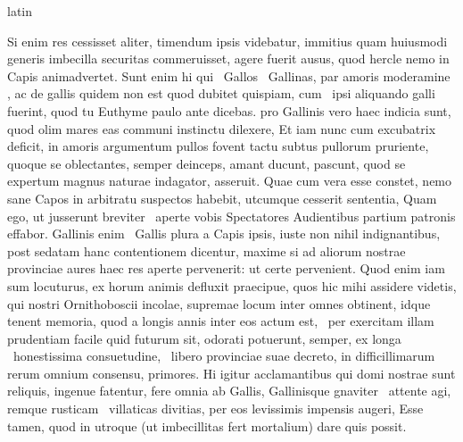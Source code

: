 \documentclass[12pt]{book}
\renewenvironment{latin}
    	{\begin{hyphenrules}{latin}}
    	{\end{hyphenrules}}
\begin{document}
\begin{pages}
\begin{latin}
\begin{Leftside}
                    Si enim res cessisset aliter, timendum ipsis videbatur, 
                     immitius quam huiusmodi generis imbecilla securitas commeruisset, agere fuerit ausus, quod hercle nemo in Capis animadvertet. 
                    Sunt enim hi qui ﻿\ampersand\ Gallos ﻿\ampersand\ Gallinas, par amoris moderamine , 
                    ac de gallis quidem non est quod dubitet quispiam, cum ﻿\ampersand\ ipsi aliquando galli fuerint, 
                    quod tu Euthyme paulo ante dicebas. 
                    pro Gallinis vero haec indicia sunt, quod olim mares eas communi instinctu dilexere, 
                    Et iam nunc cum excubatrix deficit, in amoris argumentum pullos fovent tactu subtus  pullorum pruriente, quoque se oblectantes, 
                    semper deinceps, amant ducunt, pascunt, 
                    quod se expertum magnus naturae indagator, asseruit. 
                    Quae cum vera esse constet, nemo sane Capos in arbitratu suspectos habebit, utcumque cesserit sententia, 
                    Quam ego, ut jusserunt breviter ﻿\ampersand\ aperte vobis Spectatores
                    Audientibus partium patronis effabor.  
                     Gallinis enim ﻿\ampersand\ Gallis plura a Capis ipsis, iuste non nihil indignantibus, 
                    post sedatam hanc contentionem dicentur, maxime si ad aliorum nostrae provinciae aures haec res aperte pervenerit: 
                    ut certe pervenient. 
                    Quod enim iam sum locuturus, ex horum animis defluxit praecipue, quos hic mihi assidere videtis, 
                    qui nostri Ornithoboscii incolae, supremae  locum inter omnes obtinent, 
                    idque tenent memoria, quod a longis annis inter eos actum est, ﻿\ampersand\ per exercitam illam prudentiam facile quid futurum sit, 
                    odorati potuerunt, semper, ex longa ﻿\ampersand\ honestissima consuetudine, ﻿\ampersand\ libero provinciae suae decreto, 
                    in difficillimarum rerum  omnium consensu, primores. 
                    Hi igitur acclamantibus qui domi nostrae sunt reliquis, ingenue fatentur, fere omnia ab Gallis, 
                    Gallinisque gnaviter ﻿\ampersand\ attente agi, remque rusticam ﻿\ampersand\ villaticas divitias, per eos levissimis impensis augeri, 
                    Esse tamen, quod in utroque (ut imbecillitas fert mortalium)  dare quis possit. 

\end{Leftside}
\end{latin}
\end{pages}
\end{document}
